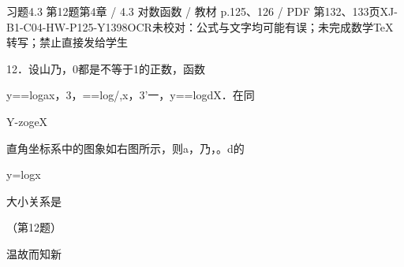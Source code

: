 \begin{bankitem}{习题4.3 第12题}{第4章 / 4.3 对数函数 / 教材 p.125、126 / PDF 第132、133页}{XJ-B1-C04-HW-P125-Y1398}{OCR未校对：公式与文字均可能有误；未完成数学TeX转写；禁止直接发给学生}
\begin{ocrdraft}
\par
12．设山乃，0都是不等于1的正数，函数
\par
y==logax，3，==log/,x，3'一，y==logdX．在同
\par
Y-zogeX
\par
直角坐标系中的图象如右图所示，则a，乃，。d的
\par
y=logx
\par
大小关系是
\par
（第12题）
\par
[教材p.126 / PDF第133页]
\par
温故而知新
\end{ocrdraft}
\end{bankitem}
